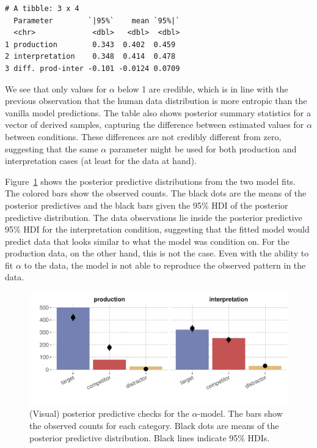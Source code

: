 \documentclass{article}
\begin{document}
\begin{verbatim}
# A tibble: 3 x 4
  Parameter        `|95%`    mean `95%|`
  <chr>             <dbl>   <dbl>  <dbl>
1 production        0.343  0.402  0.459
2 interpretation    0.348  0.414  0.478
3 diff. prod-inter -0.101 -0.0124 0.0709
\end{verbatim}

We see that only values for \(\alpha\) below 1 are credible, which is in line with the previous observation that the human data distribution is more entropic than the vanilla model predictions.
The table also shows posterior summary statistics for a vector of derived samples, capturing the difference between estimated values for $\alpha$ between conditions.
These differences are not credibly different from zero, suggesting that the same \(\alpha\) parameter might be used for both production and interpretation cases (at least for the data at hand).

Figure~\ref{fig:PPC-alpha-model} shows the posterior predictive distributions from the two model fits.
The colored bars show the observed counts.
The black dots are the means of the posterior predictives and the black bars given the 95\% HDI of the posterior predictive distribution.
The data observations lie inside the posterior predictive 95\% HDI for the interpretation condition, suggesting that the fitted model would predict data that looks similar to what the model was condition on.
For the production data, on the other hand, this is not the case.
Even with the ability to fit \(\alpha\) to the data, the model is not able to reproduce the observed pattern in the data.

\begin{figure}[t]
  \centering

  \includegraphics[width = 0.9 \textwidth]{00-pics/PPC-alpha-model.pdf}

  \caption{(Visual) posterior predictive checks for the $\alpha$-model.
    The bars show the observed counts for each category.
    Black dots are means of the posterior predictive distribution.
    Black lines indicate 95\% HDIs.
  }
  \label{fig:PPC-alpha-model}
\end{figure}
\end{document}

